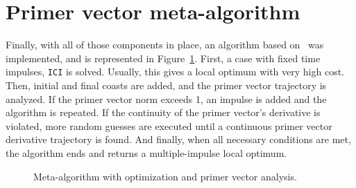 


\section{Primer vector meta-algorithm}

Finally, with all of those components in place, an algorithm based on~ was implemented, and is represented in Figure~\ref{fig:meta_alg}. First, a case with fixed time impulses, \texttt{ICI} is solved. Usually, this gives a local optimum with very high cost. Then, initial and final coasts are added, and the primer vector trajectory is analyzed. If the primer vector norm exceeds 1, an impulse is added and the algorithm is repeated. If the continuity of the primer vector's derivative is violated, more random guesses are executed until a continuous primer vector derivative trajectory is found. And finally, when all necessary conditions are met, the algorithm ends and returns a multiple-impulse local optimum.

\begin{figure}[htbp]
    \centering
    \caption{Meta-algorithm with optimization and primer vector analysis.}
    \label{fig:meta_alg}
\end{figure}
